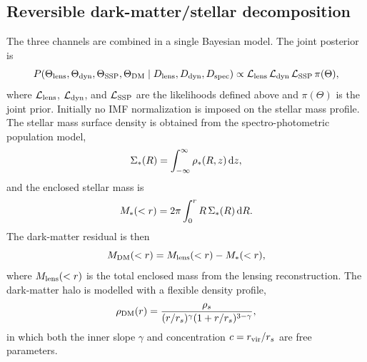 \documentclass{article}
\begin{document}
\subsection{Reversible dark-matter/stellar decomposition}
The three channels are combined in a single Bayesian model. The joint posterior is
\begin{equation}
P(\Theta_{\rm lens}, \Theta_{\rm dyn}, \Theta_{\rm SSP}, \Theta_{\rm DM}
\mid D_{\rm lens}, D_{\rm dyn}, D_{\rm spec})
\propto
\mathcal{L}_{\rm lens}\, \mathcal{L}_{\rm dyn}\, \mathcal{L}_{\rm SSP}\,
\pi(\Theta),
\label{eq:joint_posterior}
\end{equation}
where \(\mathcal{L}_{\rm lens}\), \(\mathcal{L}_{\rm dyn}\), and \(\mathcal{L}_{\rm SSP}\) are the likelihoods defined above and \(\pi(\Theta)\) is the joint prior. Initially no IMF normalization is imposed on the stellar mass profile. The stellar mass surface density is obtained from the spectro-photometric population model,
\begin{equation}
\Sigma_*(R) = \int_{-\infty}^{\infty} \rho_*(R,z)\, {\rm d}z,
\label{eq:surface_density}
\end{equation}
and the enclosed stellar mass is
\begin{equation}
M_*(<r) = 2\pi \int_0^r R\, \Sigma_*(R)\, {\rm d}R.
\label{eq:enclosed_stellar}
\end{equation}
The dark-matter residual is then
\begin{equation}
M_{\rm DM}(<r) = M_{\rm lens}(<r) - M_*(<r),
\label{eq:dm_residual}
\end{equation}
where \(M_{\rm lens}(<r)\) is the total enclosed mass from the lensing reconstruction. The dark-matter halo is modelled with a flexible density profile,
\begin{equation}
\rho_{\rm DM}(r) = \frac{\rho_s}{(r/r_s)^{\gamma} (1 + r/r_s)^{3-\gamma}},
\label{eq:dm_halo}
\end{equation}
in which both the inner slope \(\gamma\) and concentration \(c = r_{\rm vir}/r_s\) are free parameters.
\end{document}
